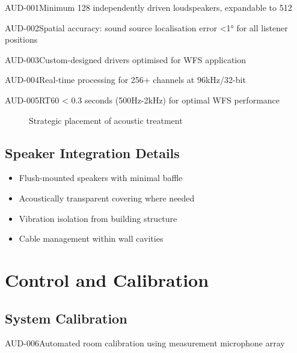 \begin{requirement}{AUD-001}{Minimum 128 independently driven loudspeakers, expandable to 512}
\begin{requirement}{AUD-002}{Spatial accuracy: sound source localisation error <1° for all listener positions}
\begin{requirement}{AUD-003}{Custom-designed drivers optimised for WFS application}
\begin{requirement}{AUD-004}{Real-time processing for 256+ channels at 96kHz/32-bit}
\begin{requirement}{AUD-005}{RT60 < 0.3 seconds (500Hz-2kHz) for optimal WFS performance}
\begin{figure}[H]
\caption{Strategic placement of acoustic treatment}
\end{figure}

\subsection{Speaker Integration Details}

\begin{itemize}
    \item Flush-mounted speakers with minimal baffle
    \item Acoustically transparent covering where needed
    \item Vibration isolation from building structure
    \item Cable management within wall cavities
\end{itemize}

\section{Control and Calibration}

\subsection{System Calibration}

\begin{requirement}{AUD-006}{Automated room calibration using measurement microphone array}


\end{requirement}
\end{requirement}
\end{requirement}
\end{requirement}
\end{requirement}
\end{requirement}
